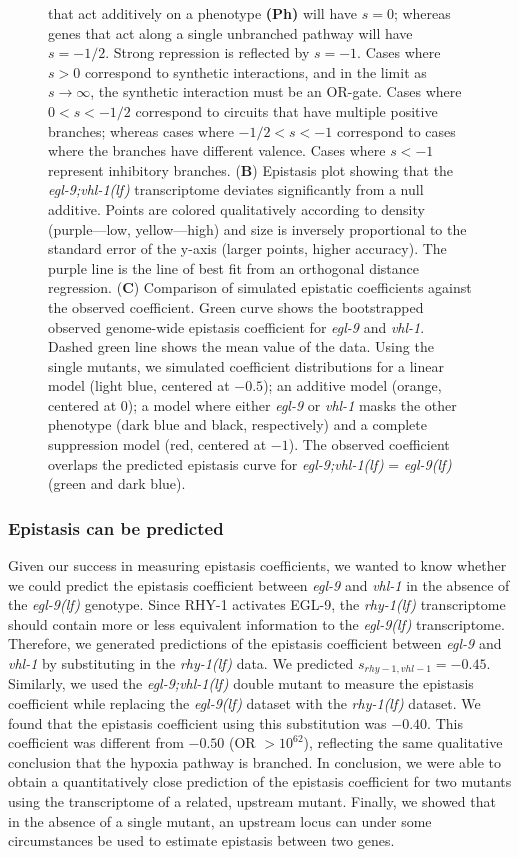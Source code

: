 \documentclass[9pt,twocolumn,twoside]{pnas-new}
\newcommand{\gene}[1]{\emph{#1}}
\newcommand{\egl}{\emph{egl-9(lf)}}
\newcommand{\rhy}{\emph{rhy-1(lf)}}
\newcommand{\eglvhl}{\emph{egl-9;vhl-1(lf)}}
\newcommand{\eglp}{EGL-9}
\newcommand{\rhyp}{RHY-1}
\begin{document}
\begin{figure}[tbhp]
{that act additively on a phenotype \textbf{(Ph)} will have $s=0$; whereas genes that act
along a single unbranched pathway will have $s=-1/2$. Strong repression
is reflected by $s=-1$. Cases where $s>0$ correspond to synthetic interactions,
and in the limit as $s\rightarrow\infty$, the synthetic interaction must be
an OR-gate. Cases where $0 < s < -1/2$ correspond to circuits
that have multiple positive branches; whereas cases where
$-1/2<s< -1$ correspond to cases where the branches have different valence.
Cases where $s < -1$ represent inhibitory branches.
(\textbf{B}) Epistasis plot showing
that the \eglvhl{} transcriptome deviates significantly from a null additive.
Points are colored qualitatively according to density (purple---low,
yellow---high) and size is inversely proportional to the standard
error of the y-axis (larger points, higher accuracy). The purple line
is the line of best fit from an orthogonal distance regression.
(\textbf{C}) Comparison of simulated epistatic coefficients against the observed
coefficient. Green curve shows the bootstrapped observed genome-wide epistasis
coefficient for \gene{egl-9} and \gene{vhl-1}. Dashed green line shows the mean
value of the data. Using the single mutants, we simulated coefficient
distributions for a linear model (light blue, centered at $-0.5$);
an additive model (orange, centered at 0); a model where either
\gene{egl-9} or \gene{vhl-1} masks the other phenotype (dark blue and black,
respectively) and a complete suppression model (red, centered at $-1$).
The observed coefficient overlaps the predicted epistasis curve for
\eglvhl{} = \egl{} (green and dark blue).
}
\label{fig:egl9epistasis}
\end{figure}

\subsubsection*{Epistasis can be predicted}
Given our success in measuring epistasis coefficients, we wanted to know whether
we could predict the epistasis coefficient between \gene{egl-9} and \gene{vhl-1}
in the absence of the \egl{} genotype. Since \rhyp{} activates
\eglp{}, the \rhy{} transcriptome should contain more or less
equivalent information to the \egl{} transcriptome. Therefore, we generated
predictions of the epistasis coefficient between \gene{egl-9} and \gene{vhl-1}
by substituting in the \rhy{} data. We predicted $s_{rhy-1,vhl-1} = -0.45$.
Similarly, we used the \eglvhl{} double mutant to
measure the epistasis coefficient while replacing the \egl{} dataset with the \rhy{}
dataset. We found that the epistasis coefficient using this substitution was $-0.40$.
This coefficient was different from $-0.50$ (OR $>10^{62}$), reflecting the same
qualitative conclusion that the hypoxia pathway is branched.
In conclusion, we were able to obtain a quantitatively close prediction of the
epistasis coefficient for two mutants using the transcriptome of a related,
upstream mutant. Finally, we showed that in the absence of a single mutant, an
upstream locus can under some circumstances be used to estimate epistasis
between two genes.
\end{document}
